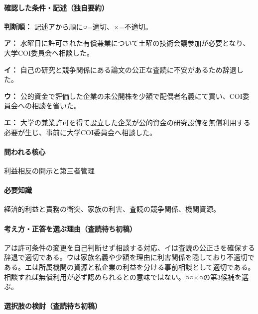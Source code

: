 \paragraph{確認した条件・記述（独自要約）}\mbox{}\par

\noindent\textbf{判断順：} 記述アから順に○=適切、×=不適切。\par

\noindent\textbf{ア：} 水曜日に許可された有償兼業について土曜の技術会議参加が必要となり、大学COI委員会へ相談した。\par

\noindent\textbf{イ：} 自己の研究と競争関係にある論文の公正な査読に不安があるため辞退した。\par

\noindent\textbf{ウ：} 公的資金で評価した企業の未公開株を少額で配偶者名義にて買い、COI委員会への相談を省いた。\par

\noindent\textbf{エ：} 大学の兼業許可を得て設立した企業が公的資金の研究設備を無償利用する必要が生じ、事前に大学COI委員会へ相談した。\par

\paragraph{問われる核心} 利益相反の開示と第三者管理

\paragraph{必要知識} 経済的利益と責務の衝突、家族の利害、査読の競争関係、機関資源。

\paragraph{考え方・正答を選ぶ理由（査読待ち初稿）} アは許可条件の変更を自己判断せず相談する対応、イは査読の公正さを確保する辞退で適切である。ウは家族名義や少額を理由に利害関係を隠しており不適切である。エは所属機関の資源と私企業の利益を分ける事前相談として適切である。相談すれば無償利用が必ず認められるとの意味ではない。○○×○の第3候補を選ぶ。

\paragraph{選択肢の検討（査読待ち初稿）}\mbox{}\par

